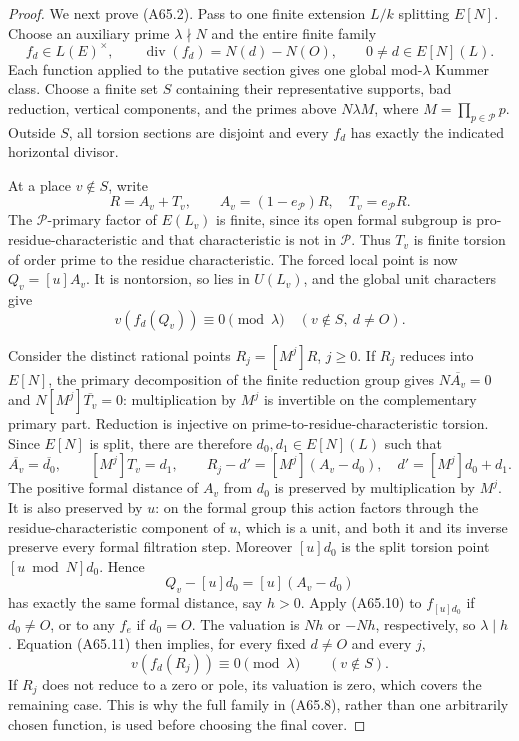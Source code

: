 \begin{proof}
We next prove (A65.2). Pass to one finite extension
$L/k$ splitting $E[N]$. Choose an auxiliary prime
$\lambda\nmid N$ and the entire finite family
\[
 f_d\in L(E)^\times,\qquad
 \operatorname{div}(f_d)=N(d)-N(O),
 \qquad 0\ne d\in E[N](L).
 \tag{A65.8}
\]
Each function applied to the putative section gives
one global mod-$\lambda$ Kummer class. Choose a finite
set $S$ containing their representative supports,
bad reduction, vertical components, and the primes
above $N\lambda M$, where $M=\prod_{p\in\mathcal P}p$.
Outside $S$, all torsion sections are disjoint and
every $f_d$ has exactly the indicated horizontal divisor.

At a place $v\notin S$, write
\[
 R=A_v+T_v,\qquad
 A_v=(1-e_{\mathcal P})R,\quad
 T_v=e_{\mathcal P}R.
 \tag{A65.9}
\]
The $\mathcal P$-primary factor of $E(L_v)$ is finite,
since its open formal subgroup is pro-residue-characteristic
and that characteristic is not in $\mathcal P$.
Thus $T_v$ is finite torsion of order prime to the
residue characteristic. The forced local point is now
$Q_v=[u]A_v$. It is nontorsion, so lies in $U(L_v)$,
and the global unit characters give
\[
 v(f_d(Q_v))\equiv0\pmod\lambda
                 \quad(v\notin S,\ d\ne O).
 \tag{A65.10}
\]

Consider the distinct rational points $R_j=[M^j]R$,
$j\ge0$. If $R_j$ reduces into $E[N]$, the primary
decomposition of the finite reduction group gives
$N\overline{A_v}=0$ and
$N[M^j]\overline{T_v}=0$: multiplication by $M^j$
is invertible on the complementary primary part.
Reduction is injective on prime-to-residue-characteristic
torsion. Since $E[N]$ is split, there are therefore
$d_0,d_1\in E[N](L)$ such that
\[
 \overline{A_v}=\overline{d_0},\qquad
 [M^j]T_v=d_1,\qquad
 R_j-d'=[M^j](A_v-d_0),\quad
 d'=[M^j]d_0+d_1.
 \tag{A65.11}
\]
The positive formal distance of $A_v$ from $d_0$ is
preserved by multiplication by $M^j$. It is also
preserved by $u$: on the formal group this action
factors through the residue-characteristic component
of $u$, which is a unit, and both it and its inverse
preserve every formal filtration step. Moreover
$[u]d_0$ is the split torsion point
$[u\bmod N]d_0$. Hence
\[
 Q_v-[u]d_0=[u](A_v-d_0)
 \tag{A65.12}
\]
has exactly the same formal distance, say $h>0$.
Apply (A65.10) to $f_{[u]d_0}$ if $d_0\ne O$,
or to any $f_e$ if $d_0=O$. The valuation is
$Nh$ or $-Nh$, respectively, so $\lambda\mid h$.
Equation (A65.11) then implies, for every fixed
$d\ne O$ and every $j$,
\[
 v(f_d(R_j))\equiv0\pmod\lambda\qquad(v\notin S).
 \tag{A65.13}
\]
If $R_j$ does not reduce to a zero or pole, its
valuation is zero, which covers the remaining case.
This is why the full family in (A65.8), rather than
one arbitrarily chosen function, is used before
choosing the final cover.


\end{proof}
